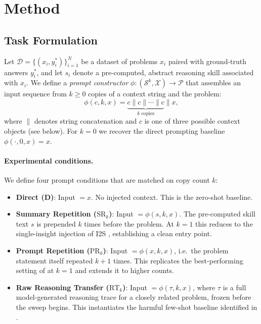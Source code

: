 
\section{Method}
\label{sec:method}

\subsection{Task Formulation}
\label{subsec:task}

Let $\mathcal{D} = \{(x_i, y_i^*)\}_{i=1}^{N}$ be a dataset of problems $x_i$ paired with
ground-truth answers $y_i^*$, and let $s_i$ denote a pre-computed, abstract reasoning skill
associated with $x_i$.
We define a \emph{prompt constructor} $\phi : (\mathcal{S}^k, \mathcal{X}) \to \mathcal{P}$
that assembles an input sequence from $k \geq 0$ copies of a context string and the problem:
\begin{equation}
  \phi(c, k, x) = \underbrace{c \| c \| \cdots \| c}_{k\text{ copies}} \| x,
  \label{eq:phi}
\end{equation}
where $\|$ denotes string concatenation and $c$ is one of three possible context objects (see
below).  For $k = 0$ we recover the direct prompting baseline $\phi(\cdot, 0, x) = x$.

\paragraph{Experimental conditions.}
We define four prompt conditions that are matched on copy count $k$:

\begin{itemize}
  \item \textbf{Direct (D)}: Input $= x$.  No injected context.  This is the zero-shot baseline.
  \item \textbf{Summary Repetition (\(\mathrm{SR}_k\))}: Input $= \phi(s, k, x)$.
        The pre-computed skill text $s$ is prepended $k$ times before the problem.
        At $k{=}1$ this reduces to the single-insight injection of I2S
        \cite{wang2025harm}, establishing a clean entry point.
  \item \textbf{Prompt Repetition (\(\mathrm{PR}_k\))}: Input $= \phi(x, k, x)$, i.e.\ the
        problem statement itself repeated $k{+}1$ times.
        This replicates the best-performing setting of \citet{leviathan2025prompt}
        at $k{=}1$ and extends it to higher counts.
  \item \textbf{Raw Reasoning Transfer (\(\mathrm{RT}_k\))}: Input $= \phi(\tau, k, x)$,
        where $\tau$ is a full model-generated reasoning trace for a closely related problem,
        frozen before the sweep begins.
        This instantiates the harmful few-shot baseline identified in \citet{wang2025harm}.
\end{itemize}

